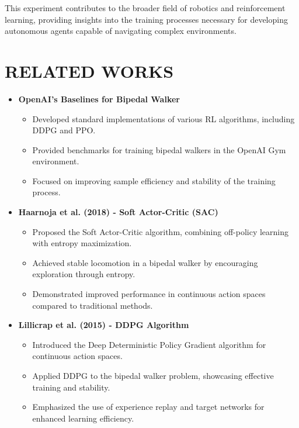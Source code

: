 \documentclass[letterpaper]{article}
\begin{document}
This experiment contributes to the broader field of robotics and reinforcement learning, providing insights into the training processes necessary for developing autonomous agents capable of navigating complex environments.

\vspace{1em}
\section{RELATED WORKS}
\vspace{1em}

\begin{itemize}
    \item \textbf{OpenAI's Baselines for Bipedal Walker}
    \begin{itemize}
        \item Developed standard implementations of various RL algorithms, including DDPG and PPO.
        \item Provided benchmarks for training bipedal walkers in the OpenAI Gym environment.
        \item Focused on improving sample efficiency and stability of the training process.
    \end{itemize}
\vspace{1em}
    \item \textbf{Haarnoja et al. (2018) - Soft Actor-Critic (SAC)}
    \begin{itemize}
        \item Proposed the Soft Actor-Critic algorithm, combining off-policy learning with entropy maximization.
        \item Achieved stable locomotion in a bipedal walker by encouraging exploration through entropy.
        \item Demonstrated improved performance in continuous action spaces compared to traditional methods.
    \end{itemize}

    \item \textbf{Lillicrap et al. (2015) - DDPG Algorithm}
    \begin{itemize}
        \item Introduced the Deep Deterministic Policy Gradient algorithm for continuous action spaces.
        \item Applied DDPG to the bipedal walker problem, showcasing effective training and stability.
        \item Emphasized the use of experience replay and target networks for enhanced learning efficiency.
    \end{itemize}


\end{itemize}
\end{document}
